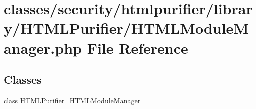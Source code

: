 \hypertarget{HTMLModuleManager_8php}{\section{classes/security/htmlpurifier/library/\+H\+T\+M\+L\+Purifier/\+H\+T\+M\+L\+Module\+Manager.php File Reference}
\label{HTMLModuleManager_8php}
}
\subsection*{Classes}
\begin{DoxyCompactItemize}
\item 
class \hyperlink{classHTMLPurifier__HTMLModuleManager}{H\+T\+M\+L\+Purifier\+\_\+\+H\+T\+M\+L\+Module\+Manager}
\end{DoxyCompactItemize}
